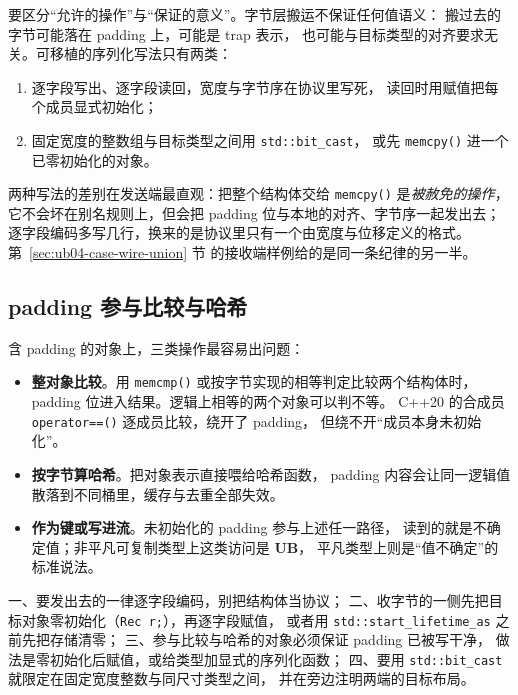 \documentclass[12pt,a4paper,fontset=fandol]{ctexbook}
\newcommand{\cpp}[1]{C++#1}
\newcommand{\Fn}[1]{\texttt{#1()}}
\newcommand{\Tp}[1]{\texttt{#1}}
\newcommand{\Bk}{\discretionary{}{}{}}
\newcommand{\UB}{\textbf{\textsf{UB}}}
\begin{document}
要区分“允许的操作”与“保证的意义”。字节层搬运不保证任何值语义：
搬过去的字节可能落在 padding 上，可能是 trap 表示，
也可能与目标类型的对齐要求无关。可移植的序列化写法只有两类：
\begin{enumerate}
\item 逐字段写出、逐字段读回，宽度与字节序在协议里写死，
      读回时用赋值把每个成员显式初始化；
\item 固定宽度的整数组与目标类型之间用 \Tp{std::bit\_cast}，
      或先 \Fn{memcpy} 进一个已零初始化的对象。
\end{enumerate}

两种写法的差别在发送端最直观：把整个结构体交给 \Fn{memcpy} 是\emph{被赦免的操作}，
它不会坏在别名规则上，但会把 padding 位与本地的对齐、字节序一起发出去；
逐字段编码多写几行，换来的是协议里只有一个由宽度与位移定义的格式。
第~\ref{sec:ub04-case-wire-union} 节 的接收端样例给的是同一条纪律的另一半。

\subsection{padding 参与比较与哈希}\label{sec:ub04-padding-compare}

含 padding 的对象上，三类操作最容易出问题：
\begin{itemize}
\item \textbf{整对象比较}。用 \Fn{memcmp} 或按字节实现的相等判定比较两个结构体时，
      padding 位进入结果。逻辑上相等的两个对象可以判不等。
      \cpp{20} 的合成员 \Fn{operator==} 逐成员比较，绕开了 padding，
      但绕不开“成员本身未初始化”。
\item \textbf{按字节算哈希}。把对象表示直接喂给哈希函数，
      padding 内容会让同一逻辑值散落到不同桶里，缓存与去重全部失效。
\item \textbf{作为键或写进流}。未初始化的 padding 参与上述任一路径，
      读到的就是不确定值；非平凡可复制类型上这类访问是 \UB{}，
      平凡类型上则是“值不确定”的标准说法。
\end{itemize}

\begin{bestpractice}[title={按字节读写守则}]
一、要发出去的一律逐字段编码，别把结构体当协议；
二、收字节的一侧先把目标对象零初始化（\Tp{Rec r{};}），再逐字段赋值，
或者用 \Tp{std::start{\Bk}\_lifetime{\Bk}\_as} 之前先把存储清零；
三、参与比较与哈希的对象必须保证 padding 已被写干净，
做法是零初始化后赋值，或给类型加显式的序列化函数；
四、要用 \Tp{std::bit\_cast} 就限定在固定宽度整数与同尺寸类型之间，
并在旁边注明两端的目标布局。
\end{bestpractice}
\end{document}
